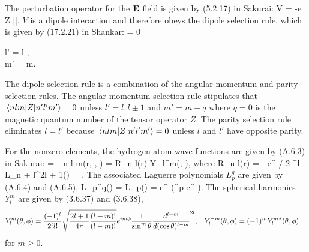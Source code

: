 \begin{solution}
	The perturbation operator for the $\mathbf{E}$ field is given by (5.2.17) in Sakurai:
	\beq
		V = -e Z |\vE|.
	\eeq
	$V$ is a dipole interaction and therefore obeys the dipole selection rule, which is given by (17.2.21) in Shankar:
	\beq
		 = 0  \begin{cases} l' = l , \\ m' = m. \end{cases}
	\eeq
	The dipole selection rule is a combination of the angular momentum and parity selection rules.  The angular momentum selection rule stipulates that $\mel{n l m}{Z}{n' l' m'} = 0$ unless $l' = l, l \pm 1$ and $m' = m + q$ where $q = 0$ is the magnetic quantum number of the tensor operator $Z$.  The parity selection rule eliminates $l = l'$ because $\mel{n l m}{Z}{n' l' m'} = 0$ unless $l$ and $l'$ have opposite parity.
	
	For the nonzero elements, the hydrogen atom wave functions are given by (A.6.3) in Sakurai:
	\beq
		 = \psi_{n l m}(r, \tht, \phi) = R_{n l}(r) Y_l^m(\tht, \phi),
	\eeq
	where
	\beqn \label{R}
		R_{n l}(r) = - e^{-\rho / 2} \rho^l L_{n + l}^{2l + 1}(\rho)
		\rho = .
	\eeqn
	The associated Laguerre polynomials $L_p^q$ are given by (A.6.4) and (A.6.5),
	\beqn \label{laguerre}
		L_p^q(\rho) = 
		L_p(\rho) = e^\rho \dv[p]{}{\rho} (\rho^p e^{-\rho}).
	\eeqn
	The spherical harmonics $Y_l^m$ are given by (3.6.37) and (3.6.38),
	\begin{align} \label{harm}
		Y_l^m(\theta, \phi) &= \frac{(-1)^l}{2^l l!} \sqrt{\frac{2l + 1}{4\pi} \frac{(l + m)!}{(l - m)!}} e^{i m \phi} \frac{1}{\sin^m{\theta}} \dv[{l - m}]{}{(\cos\theta)} (\sin\theta)^{2l}, &
		Y_l^{-m}(\theta, \phi) &= (-1)^m {Y_l^m}^*(\theta, \phi)
	\end{align}
	for $m \geq 0$.
	

\end{solution}
